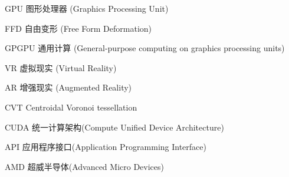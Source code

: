 \begin{denotation}

\item[GPU] 图形处理器 (Graphics Processing Unit)
\item[FFD] 自由变形 (Free Form Deformation)
\item[GPGPU] 通用计算 (General-purpose computing on graphics processing units)
\item[VR] 虚拟现实 (Virtual Reality)
\item[AR] 增强现实 (Augmented Reality)
\item[CVT] Centroidal Voronoi tessellation
\item[CUDA] 统一计算架构(Compute Unified Device Architecture)
\item[API] 应用程序接口(Application Programming Interface)
\item[AMD] 超威半导体(Advanced Micro Devices)


\end{denotation}
